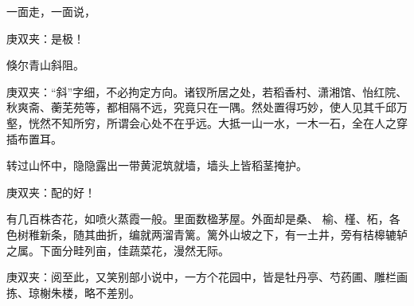 \begin{parag}
    一面走，一面说，\begin{note}庚双夹：是极！\end{note}倏尔青山斜阻。\begin{note}庚双夹：“斜”字细，不必拘定方向。诸钗所居之处，若稻香村、潇湘馆、怡红院、秋爽斋、蘅芜苑等，都相隔不远，究竟只在一隅。然处置得巧妙，使人见其千邱万壑，恍然不知所穷，所谓会心处不在乎远。大抵一山一水，一木一石，全在人之穿插布置耳。\end{note}转过山怀中，隐隐露出一带黄泥筑就墙，墙头上皆稻茎掩护。\begin{note}庚双夹：配的好！\end{note}有几百株杏花，如喷火蒸霞一般。里面数楹茅屋。外面却是桑、 榆、槿、柘，各色树稚新条，随其曲折，编就两溜青篱。篱外山坡之下，有一土井，旁有桔槔辘轳之属。下面分畦列亩，佳蔬菜花，漫然无际。\begin{note}庚双夹：阅至此，又笑别部小说中，一方个花园中，皆是牡丹亭、芍药圃、雕栏画拣、琼榭朱楼，略不差别。\end{note}
\end{parag}


